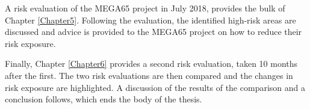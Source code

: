 A risk evaluation of the MEGA65 project in July 2018, provides the bulk of Chapter \ref{Chapter5}. Following the evaluation, the identified high-risk areas are discussed and advice is provided to the MEGA65 project on how to reduce their risk exposure. 

Finally, Chapter \ref{Chapter6} provides a second risk evaluation, taken 10 months after the first. The two risk evaluations are then compared and the changes in risk exposure are highlighted. A discussion of the results of the comparison and a conclusion follows, which ends the body of the thesis.
